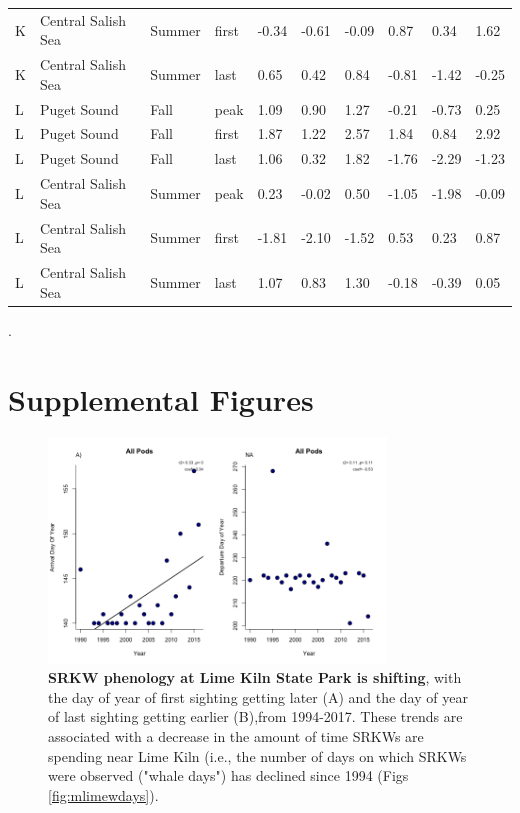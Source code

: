 \documentclass{article}
\begin{document}
\begin{table}[ht]
\begin{tabular}{|p{}|p{}|p{}|p{}|p{}p{}p{}|p{}p{}p{}|}
  K & Central Salish Sea & Summer & first & -0.34 & -0.61 & -0.09 & 0.87 & 0.34 & 1.62 \\ 
  K & Central Salish Sea & Summer & last & 0.65 & 0.42 & 0.84 & -0.81 & -1.42 & -0.25 \\ 
   \hline
L & Puget Sound & Fall & peak & 1.09 & 0.90 & 1.27 & -0.21 & -0.73 & 0.25 \\ 
  L & Puget Sound & Fall & first & 1.87 & 1.22 & 2.57 & 1.84 & 0.84 & 2.92 \\ 
  L & Puget Sound & Fall & last & 1.06 & 0.32 & 1.82 & -1.76 & -2.29 & -1.23 \\ 
  L & Central Salish Sea & Summer & peak & 0.23 & -0.02 & 0.50 & -1.05 & -1.98 & -0.09 \\ 
  L & Central Salish Sea & Summer & first & -1.81 & -2.10 & -1.52 & 0.53 & 0.23 & 0.87 \\ 
  L & Central Salish Sea & Summer & last & 1.07 & 0.83 & 1.30 & -0.18 & -0.39 & 0.05 \\ 
   \hline
\end{tabular}
\endgroup
\end{table}. \newline


\newpage

\section* {Supplemental Figures}


\begin{figure}[p]
\includegraphics[width=0.8\textwidth]{../analyses/orcaphen/figures/phentrends_lime_2panels.png} 
\caption{\textbf{SRKW phenology at Lime Kiln State Park is shifting}, with the day of year of first sighting getting later (A) and the day of year of last sighting getting earlier (B),from 1994-2017. These trends are associated with a decrease in the amount of time SRKWs are spending near Lime Kiln (i.e., the number of days on which SRKWs were observed ("whale days") has declined since 1994 (Figs \ref{fig:mlimewdays}).}
\label{fig:limetime}
\end{figure}
\end{document}
